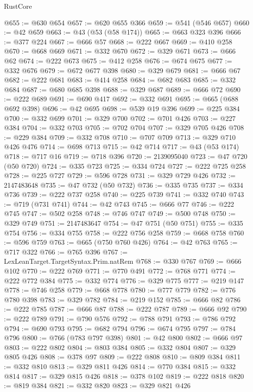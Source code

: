 \begin{lexlean}{RustCore}
\begin{coremodule}
@655 := @630 @654
@657 := @620 @655 @366
@659 := @541 (@546 @657)
@660 := @42 @659
@663 := @43 (@53 (@58 @174))
@665 := @663 @323 @396
@666 := @377 @224
@667 := @666 @57
@668 := @222 @667
@669 := @410 @258
@670 := @668 @669
@671 := @332 @670
@672 := @329 @671
@673 := @666 @62
@674 := @222 @673
@675 := @412 @258
@676 := @674 @675
@677 := @332 @676
@679 := @672 @677 @398
@680 := @329 @679
@681 := @666 @67
@682 := @222 @681
@683 := @414 @258
@684 := @682 @683
@685 := @332 @684
@687 := @680 @685 @398
@688 := @329 @687
@689 := @666 @72
@690 := @222 @689
@691 := @690 @417
@692 := @332 @691
@695 := @665 (@688 @692 @398)
@696 := @42 @695
@698 := @539 @19 @396
@699 := @225 @384
@700 := @332 @699
@701 := @329 @700
@702 := @701 @426
@703 := @227 @384
@704 := @332 @703
@705 := @702 @704
@707 := @329 @705 @426
@708 := @229 @384
@709 := @332 @708
@710 := @707 @709
@713 := @329 @710 @426 @476
@714 := @698 @713
@715 := @42 @714
@717 := @43 (@53 @174)
@718 := @717 @16
@719 := @718 @396
@720 := 2139095040
@723 := @47 @720 (@50 @720)
@724 := @335 @723
@725 := @334 @724
@727 := @222 @725 @258
@728 := @225 @727
@729 := @596 @728
@731 := @329 @729 @426
@732 := 2147483648
@735 := @47 @732 (@50 @732)
@736 := @335 @735
@737 := @334 @736
@739 := @222 @737 @258
@740 := @225 @739
@741 := @332 @740
@743 := @719 (@731 @741)
@744 := @42 @743
@745 := @666 @77
@746 := @222 @745
@747 := @502 @258
@748 := @746 @747
@749 := @500 @748
@750 := @329 @749
@751 := 2147483647
@754 := @47 @751 (@50 @751)
@755 := @335 @754
@756 := @334 @755
@758 := @222 @756 @258
@759 := @668 @758
@760 := @596 @759
@763 := @665 (@750 @760 @426)
@764 := @42 @763
@765 := @717 @322
@766 := @765 @396
@767 := LexLeanTarget.TargetSyntax.Prim.natRem
@768 := @330 @767
@769 := @666 @102
@770 := @222 @769
@771 := @770 @491
@772 := @768 @771
@774 := @222 @772 @384
@775 := @332 @774
@776 := @329 @775
@777 := @219 @147
@778 := @746 @258
@779 := @668 @778
@780 := @777 @779
@782 := @776 @780 @398
@783 := @329 @782
@784 := @219 @152
@785 := @666 @82
@786 := @222 @785
@787 := @666 @87
@788 := @222 @787
@789 := @666 @92
@790 := @222 @789
@791 := @790 @576
@792 := @788 @791
@793 := @786 @792
@794 := @690 @793
@795 := @682 @794
@796 := @674 @795
@797 := @784 @796
@800 := @766 (@783 @797 @398)
@801 := @42 @800
@802 := @666 @97
@803 := @222 @802
@804 := @803 @384
@805 := @332 @804
@807 := @329 @805 @426
@808 := @378 @97
@809 := @222 @808
@810 := @809 @384
@811 := @332 @810
@813 := @329 @811 @426
@814 := @770 @384
@815 := @332 @814
@817 := @329 @815 @426
@818 := @378 @102
@819 := @222 @818
@820 := @819 @384
@821 := @332 @820
@823 := @329 @821 @426

\end{coremodule}
\end{lexlean}
